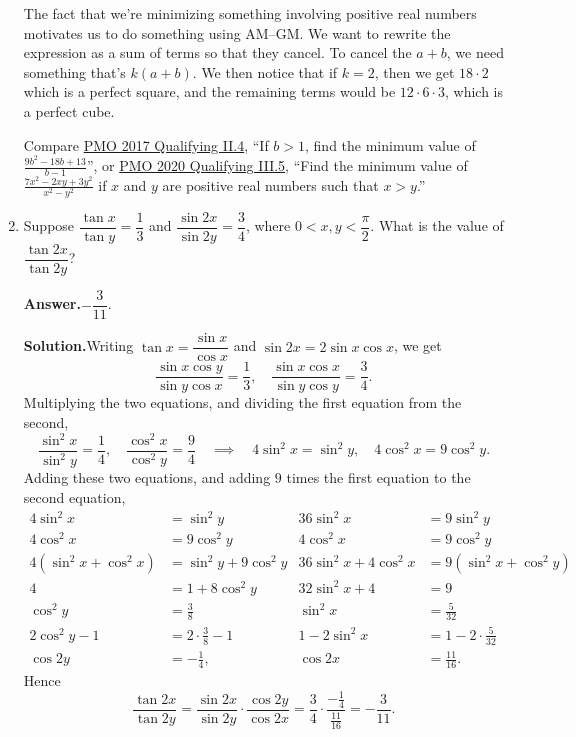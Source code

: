 \documentclass[11pt,paper=letter]{scrartcl}
\newcommand{\ans}{{\sffamily \bfseries Answer.}\;}
\newcommand{\sol}{{\sffamily \bfseries Solution.}\;}
\newenvironment{rem}%
{\noindent \ignorespaces \small \sffamily \sansmath {\bfseries Remark.}}%
{\ignorespacesafterend}
\begin{document}
\begin{enumerate}[left=0pt]
\begin{rem}
The fact that we're minimizing something involving positive real numbers motivates us to do something using AM--GM. We want to rewrite the expression as a sum of terms so that they cancel. To cancel the $a + b$, we need something that's $k(a + b)$. We then notice that if $k = 2$, then we get $18 \cdot 2$ which is a perfect square, and the remaining terms would be $12 \cdot 6 \cdot 3$, which is a perfect cube.

Compare \href{http://pmo.ph/wp-content/uploads/2014/08/19th-PMO-Qualifying-Stage-Questions-and-Answers.pdf}{PMO 2017 Qualifying II.4}, ``If $b > 1$, find the minimum value of $\frac{9b^2 - 18b + 13}{b - 1}$'', or  \href{https://cjquines.com/files/pmo2020quals.pdf}{PMO 2020 Qualifying III.5}, ``Find the minimum value of $\frac{7x^2 - 2xy + 3y^2}{x^2 - y^2}$ if $x$ and $y$ are positive real numbers such that $x > y$.''
\end{rem}

\item Suppose $\dfrac{\tan x}{\tan y} = \dfrac{1}{3}$ and $\dfrac{\sin 2x}{\sin 2y} = \dfrac{3}{4}$, where $0 < x, y < \dfrac{\pi}{2}$. What is the value of $\dfrac{\tan 2x}{\tan 2y}$?

\ans $\boxed{-\dfrac{3}{11}}$.

\sol Writing $\tan x = \dfrac{\sin x}{\cos x}$ and $\sin 2x = 2 \sin x \cos x$, we get \[
  \frac{\sin x \cos y}{\sin y \cos x} = \frac{1}{3}, \quad \frac{\sin x \cos x}{\sin y \cos y} = \frac{3}{4}.
\]
Multiplying the two equations, and dividing the first equation from the second, \[
  \frac{\sin^2 x}{\sin^2 y} = \frac{1}{4}, \quad \frac{\cos^2 x}{\cos^2 y} = \frac{9}{4} \quad \implies \quad 4\sin^2x = \sin^2y, \quad 4\cos^2x = 9\cos^2y.
\]
Adding these two equations, and adding $9$ times the first equation to the second equation,
\begin{align*}
4\sin^2x &= \sin^2 y & 36 \sin^2x &= 9\sin^2y \\
4\cos^2x &= 9\cos^2 y & 4 \cos^2x &= 9\cos^2y \\
4\left(\sin^2 x + \cos^2 x\right) &= \sin^2y + 9\cos^2y
& 36\sin^2x + 4\cos^2x &= 9\left(\sin^2 x + \cos^2y\right) \\
4 &= 1 + 8 \cos^2 y & 32 \sin^2x + 4 &= 9 \\
\cos^2 y &= \frac{3}{8} & \sin^2x &= \frac{5}{32} \\
2\cos^2 y - 1 &= 2\cdot\frac{3}{8} - 1 & 1 - 2\sin^2x &= 1 - 2\cdot\frac{5}{32} \\
\cos 2y &= -\frac{1}{4}, & \cos 2x &= \frac{11}{16}.
\end{align*}
Hence \[
  \frac{\tan 2x}{\tan 2y}
  = \frac{\sin 2x}{\sin 2y} \cdot \frac{\cos 2y}{\cos 2x}
  = \frac{3}{4} \cdot \frac{-\frac{1}{4}}{\frac{11}{16}} = -\frac{3}{11}.
\]


\end{enumerate}
\end{document}
